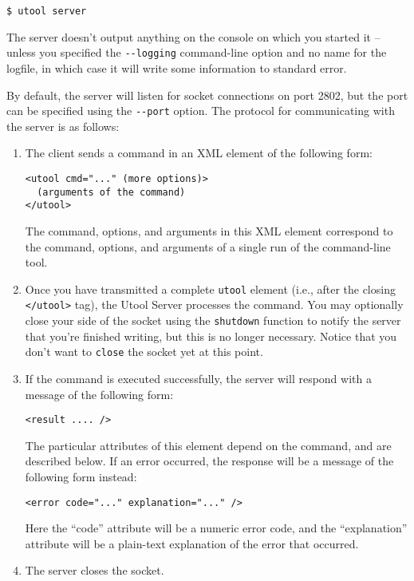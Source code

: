 \begin{verbatim}
$ utool server
\end{verbatim}

The server doesn't output anything on the console on which you started
it -- unless you specified the \verb?--logging? command-line option
and no name for the logfile, in which case it will write some
information to standard error. 

By default, the server will listen for socket connections on port
2802, but the port can be specified using the \verb?--port?
option. The protocol for communicating with the server is as follows:


\begin{enumerate}
\item The client sends a command in an XML element of the following
form: 
\begin{verbatim}
<utool cmd="..." (more options)>
  (arguments of the command)
</utool>
\end{verbatim}

The command, options, and arguments in this XML element correspond to
the command, options, and arguments of a single run of the
command-line tool.


\item Once you have transmitted a complete \verb|utool| element (i.e., after the closing \verb|</utool>| tag), the Utool Server processes the command. You may optionally close your side of the socket using the \verb?shutdown? function to notify the server that you're finished writing, but this is no longer necessary. Notice that you don't want to \verb?close? the socket yet at this point.

\item If the command is executed successfully, the server will respond
with a message of the following form:

\begin{verbatim}
<result .... />
\end{verbatim}

The particular attributes of this element depend on the command, and
are described below. If an error occurred, the response will be a
message of the following form instead:

\begin{verbatim}
<error code="..." explanation="..." />
\end{verbatim}

Here the ``code'' attribute will be a numeric error code, and the
``explanation'' attribute will be a plain-text explanation of the
error that occurred.

\item The server closes the socket.
\end{enumerate}


